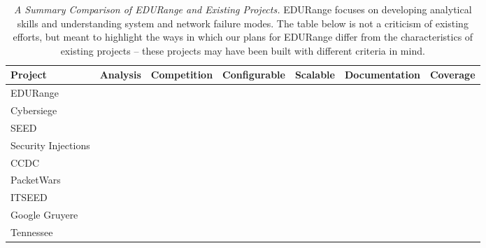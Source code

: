 \begin{table*}[ht]
\caption{{\em A Summary Comparison of EDURange and Existing Projects.} 
EDURange focuses on developing analytical skills and understanding system and network failure modes. The table below is not a criticism of existing efforts, but meant to highlight the ways in which our plans for EDURange differ from the characteristics of existing projects -- these projects may have been built with different criteria in mind.}
\begin{center}
\begin{tabular}{|l||c|c|c|c|c|c|}
\hline
 {\bf Project} & {\bf Analysis} & 
                 {\bf Competition} &
                 {\bf Configurable} & 
                 {\bf Scalable} & 
                 {\bf Documentation} &
                 {\bf Coverage}\\
\hline
 EDURange &  %
\\
\hline
 Cybersiege & \\
\hline
 SEED & \\
\hline
 Security Injections & \\
\hline
 CCDC & \\
\hline
 PacketWars & \\
\hline
ITSEED & \\
\hline
 Google Gruyere & \\
\hline
Tennessee &\\
\hline
\end{tabular}
\end{center}
\label{table:compare}
\end{table*}


